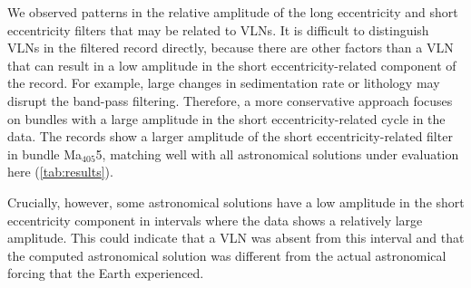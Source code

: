 \documentclass[draft]{agujournal2019}
\newcommand{\ma}[1]{Ma\(_{405}\)#1} %
\newcommand{\rez}{\textcolor{magenta}}
\newcommand{\ijk}{\textcolor{blue}}
\begin{document}
We observed patterns in the relative amplitude of the long eccentricity and short eccentricity filters that may be related to \glspl{VLN}.
It is difficult to distinguish \glspl{VLN} in the filtered record directly, because there are other factors than a \gls{VLN} that can result in a low amplitude in the short eccentricity-related component of the record.
For example, large changes in sedimentation rate or lithology may disrupt the band-pass filtering.
Therefore, a more conservative approach focuses on bundles with a large amplitude in the short eccentricity-related cycle in the data.
The records show a larger amplitude of the short eccentricity-related filter in bundle \ma{5}, matching well with all astronomical solutions under evaluation here (\cref{tab:results}).

Crucially, however, some astronomical solutions have a low amplitude in the short eccentricity component in intervals where the data shows a relatively large amplitude.
This could indicate that a \gls{VLN} was absent from this interval and that the computed astronomical solution was different from the actual astronomical forcing that the Earth experienced.
\end{document}
